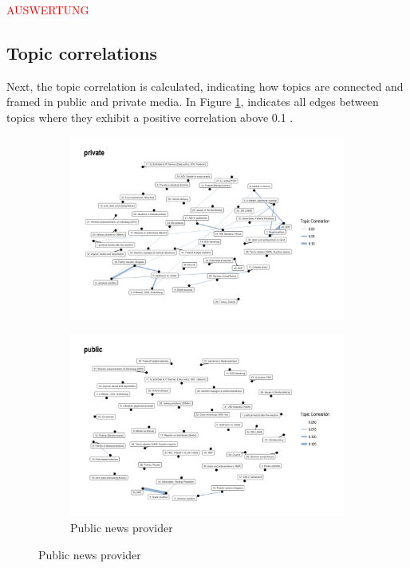 \documentclass[12pt,a4paper,notitlepage]{article}
\begin{document}
\textcolor{red}{AUSWERTUNG}

\subsection{Topic correlations}

Next, the topic correlation is calculated, indicating how topics are connected and framed in public and private media. In Figure \ref{fig_topic_correlations}, indicates all edges between topics where they exhibit a positive correlation above 0.1 \citep{roberts_model_2016}.


\begin{figure}[H]
	\caption{Topic Correlation}
		\begin{center}
		\begin{subfigure}{.7\textwidth}
			\includegraphics[width=\textwidth]{../figs/corrplot1.png}	
		\end{subfigure}
		\begin{subfigure}{.7\textwidth}
			\includegraphics[width=\textwidth]{../figs/corrplot2}
			\caption{Public news provider}	
		\end{subfigure}
		\end{center}
	\label{fig_topic_correlations}
\end{figure}
\end{document}
